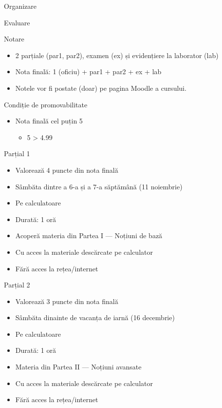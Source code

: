 \documentclass[xcolor=pdftex,romanian,colorlinks]{beamer}
\begin{document}
\begin{section}{Organizare}
\begin{frame}{Evaluare}
\begin{block}{Notare}
\begin{itemize}
\item 2 parțiale (par1, par2), examen (ex) și evidențiere la laborator (lab)
\item Nota finală: 1 (oficiu) + par1 + par2 + ex + lab
\item Notele vor fi postate (doar) pe pagina Moodle a cursului.
\end{itemize}
\end{block}

\begin{block}{Condiție de promovabilitate}
\begin{itemize}
\item Nota finală \alert{cel puțin 5}
\begin{itemize}
  \item 5 > 4.99
\end{itemize}
\end{itemize}
\end{block}

\end{frame}

\begin{frame}{Parțial 1}
\begin{itemize}
\item Valorează 4 puncte din nota finală
\item Sâmbăta dintre a 6-a și a 7-a săptămână (11 noiembrie)
\item Pe calculatoare
\item Durată: 1 oră
\item Acoperă materia din Partea I --- Noțiuni de bază
\item Cu acces la materiale descărcate pe calculator
\item Fără acces la rețea/internet
\end{itemize}
\end{frame}

\begin{frame}{Parțial 2}
\begin{itemize}
\item Valorează 3 puncte din nota finală
\item Sâmbăta dinainte de vacanța de iarnă  (16 decembrie)
\item Pe calculatoare
\item Durată: 1 oră
\item Materia din Partea II --- Noțiuni avansate
\item Cu acces la materiale descărcate pe calculator
\item Fără acces la rețea/internet
\end{itemize}
\end{frame}


\end{section}
\end{document}
